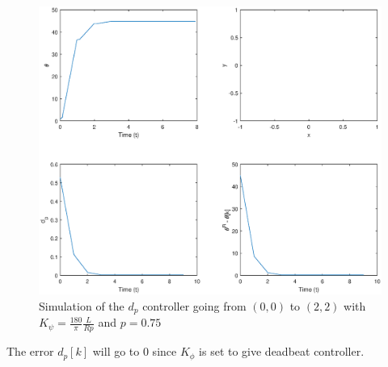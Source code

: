 \begin{figure}[H]
    \centering
    \includegraphics[width=\textwidth]{figs/perf-dp.eps}
    \caption{Simulation of the $d_p$ controller going from $(0, 0)$ to $(2, 2)$ with $K_\psi = \frac{180}{\pi} \frac{L}{Rp}$ and $p = 0.75$}\label{fig:perf-dg}
\end{figure}

The error $d_p[k]$ will go to 0 since $K_\phi$ is set to give  deadbeat controller.